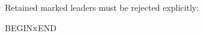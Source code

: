 \documentclass[a4paper,11pt]{article}
\providecommand{\FixtureLeaderWidth}{60pt}
\begin{document}
\FixtureTargets
Retained marked leaders must be rejected explicitly:
\par\noindent BEGIN\leaders\hbox{\(\FixtureUse{alpha}\)}\hskip\FixtureLeaderWidth\relax END\par
\end{document}
